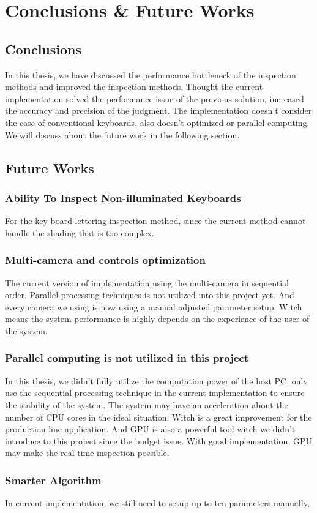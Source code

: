 \chapter{Conclusions \& Future Works}
\label{c:conclusion-and-future-works}

\section{Conclusions}
	In this thesis, we have discussed the performance bottleneck of the inspection methods and improved the inspection methods.
	Thought the current implementation solved the performance issue of the previous solution, increased the accuracy and precision of the judgment.
	The implementation doesn't consider the case of conventional keyboards, also doesn't optimized or parallel computing.
	We will discuss about the future work in the following section.

\section{Future Works}
	\subsection{Ability To Inspect Non-illuminated Keyboards}
		For the key board lettering inspection method, since the current method cannot handle the shading that is too complex.

	\subsection{Multi-camera and controls optimization}
		The current version of implementation using the multi-camera in sequential order. Parallel processing techniques is not utilized into this project yet.
		And every camera we using is now using a manual adjusted parameter setup. Witch means the system performance is highly depends on the experience of the user of the system.


	\subsection{Parallel computing is not utilized in this project}
		In this thesis, we didn't fully utilize the computation power of the host PC, only use the sequential processing technique in the current implementation to ensure the stability of the system.
		The system may have an acceleration about the number of CPU cores in the ideal situation. 
		Witch is a great improvement for the production line application.
		And GPU is also a powerful tool witch we didn't introduce to this project since the budget issue.
		With good implementation, GPU may make the real time inspection possible.
	
	\subsection{Smarter Algorithm}
		In current implementation, we still need to setup up to ten parameters manually, 
		